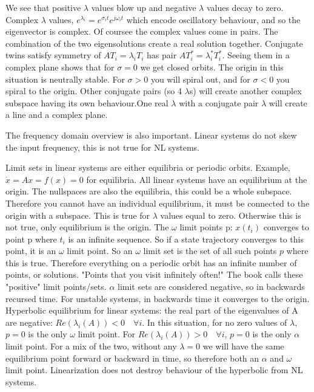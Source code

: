 \documentclass[11pt]{article}
\begin{document}
We see that positive $\lambda$ values blow up and negative $\lambda$ values decay to zero. Complex $\lambda$ values, $e^{\lambda_i} = e^{\sigma_it}e^{j\omega_i t}$ which encode oscillatory behaviour, and so the eigenvector is complex. Of coursee the complex values come in pairs. The combination of the two eigensolutions create a real solution together. Conjugate twins satisfy symmetry of $AT_i = \lambda_iT_i$ has pair $AT_i^* = \lambda_i^*T_i^*$. Seeing them in a complex plane shows that for $\sigma=0$ we get closed orbits. The origin in this situation is neutrally stable. For $\sigma>0$ you will spiral out, and for $\sigma<0$ you spiral to the origin. Other conjugate pairs (so 4 $\lambda$s) will create another complex subspace having its own behaviour.One real $\lambda$ with a conjugate pair $\lambda$ will create a line and a complex plane. 

The frequency domain overview is also important. Linear systems do not skew the input frequency, this is not true for NL systems.

Limit sets in linear systems are either equilibria or periodic orbits. Example, $\dot{x} = Ax = f(x) = 0$ for equilibria. All linear systems have an equilibrium at the origin. The nullspaces are also the equilibria, this could be a whole subspace. Therefore you cannot have an individual equilibrium, it must be connected to the origin with a subspace. This is true for $\lambda$ values equal to zero. Otherwise this is not true, only equilibrium is the origin. The $\omega$ limit points p: $x(t_i)$ converges to point p where $t_i$ is an infinite sequence. So if a state trajectory converges to this point, it is an $\omega$ limit point. So an $\omega$ limit set is the set of all such points $p$ where this is true. Therefore everything on a periodic orbit has an infinite number of points, or solutions. "Points that you visit infinitely often!" The book calls these "positive" limit points/sets. $\alpha$ limit sets are considered negative, so in backwards recursed time. For unstable systems, in backwards time it converges to the origin. Hyperbolic equilibrium for linear systems: the real part of the eigenvalues of A are negative: $Re(\lambda_i(A))<0 \quad \forall i$. In this situation, for no zero values of $\lambda$, $p=0$ is the only $\omega$ limit point. For $Re(\lambda_i(A))>0 \quad \forall i$, $p=0$ is the only $\alpha$ limit point. For a mix of the two, without any $\lambda =0$ we will have the same equilibrium point forward or backward in time, so therefore both an $\alpha$ and $\omega$ limit point. Linearization does not destroy behaviour of the hyperbolic from NL systems.
\end{document}
